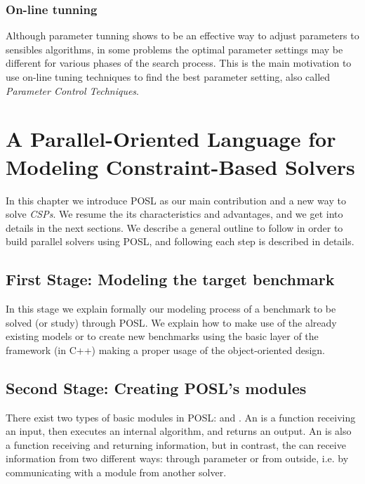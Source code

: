 \documentclass[a4paper]{book} %
\newcommand{\posl}{{\sc POSL}}
\newcommand{\csp}{\textit{CSP}}
\newcommand{\csps}{\csp\textit{s}}
\begin{document}
\subsection{On-line tunning}

Although parameter tunning shows to be an effective way to adjust parameters to sensibles algorithms, in some problems the optimal parameter settings may be different for various phases of the search process. This is the main motivation to use on-line tuning techniques to find the best parameter setting, also called \textit{Parameter Control Techniques}.

\chapter{A Parallel-Oriented Language for Modeling Constraint-Based Solvers}

In this chapter we introduce \posl{} as our main contribution and a new way to solve \csps{}. We resume the its characteristics and advantages, and we get into details in the next sections. We describe a general outline to follow in order to build parallel solvers using \posl, and following each step is described in details.

\section{First Stage: Modeling the target benchmark}

In this stage we explain formally our modeling process of a benchmark to be solved (or study) through \posl{}. We explain how to make use of the already existing models or to create new benchmarks using the basic layer of the framework (in C++) making a proper usage of the object-oriented design.


\section{Second Stage: Creating \posl's modules}

There exist two types of basic modules in \posl: \oms{} and \opchs{}. An \om{} is a function receiving an input, then executes an internal algorithm, and returns an output. An \opch{} is also a function receiving and returning information, but in contrast, the \opch can receive information from two different ways: through parameter or from outside, i.e. by communicating with a module from another solver.
\end{document}
